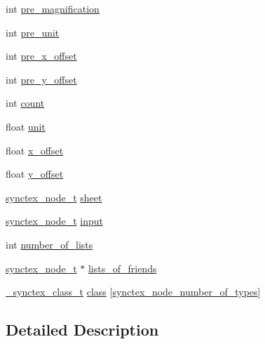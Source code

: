 \begin{DoxyCompactItemize}
\begin{tabbing}
\end{tabbing}\item 
int \hyperlink{struct____synctex__scanner__t_ab830f0b6d8d83da0eb582b353fa0eed1}{pre\+\_\+magnification}
\item 
int \hyperlink{struct____synctex__scanner__t_a3c003c5af5fae997e7a7f6f6cf302232}{pre\+\_\+unit}
\item 
int \hyperlink{struct____synctex__scanner__t_a7e40da777ed2d810359b72361a29193a}{pre\+\_\+x\+\_\+offset}
\item 
int \hyperlink{struct____synctex__scanner__t_a74d67e2408f0e5dc2cd71be04651b204}{pre\+\_\+y\+\_\+offset}
\item 
int \hyperlink{struct____synctex__scanner__t_aa09bf8eca2508d26805b53e173ecfd65}{count}
\item 
float \hyperlink{struct____synctex__scanner__t_a2172ebc84061c83e8e9c9d2039dfb3cb}{unit}
\item 
float \hyperlink{struct____synctex__scanner__t_aa6abb8a43f2d6c768736bd1e88fff5a0}{x\+\_\+offset}
\item 
float \hyperlink{struct____synctex__scanner__t_a0f0c39c893f6812770fe5665de04302f}{y\+\_\+offset}
\item 
\hyperlink{synctex__parser_8h_a78e6c0b9c2b02f3c486a2cbffeabaeae}{synctex\+\_\+node\+\_\+t} \hyperlink{struct____synctex__scanner__t_a8438cc8e64fd36c7dcb54b6f3c1450dd}{sheet}
\item 
\hyperlink{synctex__parser_8h_a78e6c0b9c2b02f3c486a2cbffeabaeae}{synctex\+\_\+node\+\_\+t} \hyperlink{struct____synctex__scanner__t_a507ab21e198032457f2178c943384239}{input}
\item 
int \hyperlink{struct____synctex__scanner__t_a50a90639f1b9198207b0066c333285b3}{number\+\_\+of\+\_\+lists}
\item 
\hyperlink{synctex__parser_8h_a78e6c0b9c2b02f3c486a2cbffeabaeae}{synctex\+\_\+node\+\_\+t} $\ast$ \hyperlink{struct____synctex__scanner__t_adf66d7da8f27c0afa90cc103dd17b619}{lists\+\_\+of\+\_\+friends}
\item 
\hyperlink{synctex__parser_8c_a115fbd71dc806e374e0b5bedb1857207}{\+\_\+synctex\+\_\+class\+\_\+t} \hyperlink{struct____synctex__scanner__t_a5313be691a11d7f4c4dc3dfa18adb010}{class} \mbox{[}\hyperlink{synctex__parser_8h_a085407d3cf15193e7db661749b83cf59abad99a41f11fbb8af51a36c57c4b362a}{synctex\+\_\+node\+\_\+number\+\_\+of\+\_\+types}\mbox{]}
\end{DoxyCompactItemize}


\subsection{Detailed Description}


